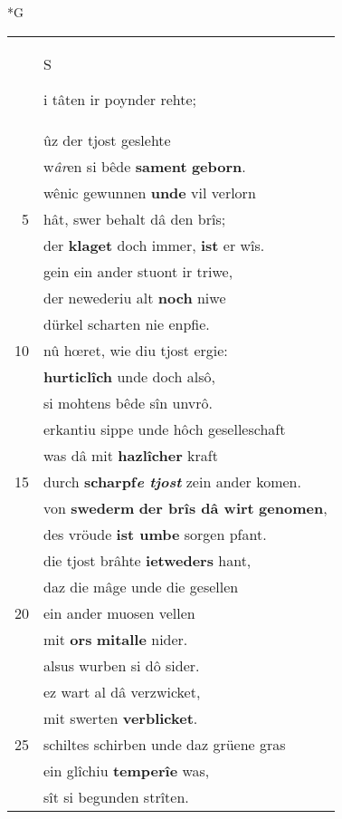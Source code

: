 \documentclass[8pt,a4paper,notitlepage]{article}
\begin{document}
\newpage
\begin{table}[ht]
\begin{minipage}[t]{0.5\linewidth}
\small
\begin{center}*G
\end{center}
\begin{tabular}{rl}
 & \begin{large}S\end{large}i tâten ir poynder rehte;\\ 
 & ûz der tjost geslehte\\ 
 & w\textit{âr}en si bêde \textbf{sament} \textbf{geborn}.\\ 
 & wênic gewunnen \textbf{unde} vil verlorn\\ 
5 & hât, swer behalt dâ den brîs;\\ 
 & der \textbf{klaget} doch immer, \textbf{ist} er wîs.\\ 
 & gein ein ander stuont ir triwe,\\ 
 & der newederiu alt \textbf{noch} niwe\\ 
 & dürkel scharten nie enpfie.\\ 
10 & nû hœret, wie diu tjost ergie:\\ 
 & \textbf{hurticlîch} unde doch alsô,\\ 
 & si mohtens bêde sîn unvrô.\\ 
 & erkantiu sippe unde hôch geselleschaft\\ 
 & was dâ mit \textbf{hazlîcher} kraft\\ 
15 & durch \textbf{scharpf\textit{e} \textit{tjost}} zein ander komen.\\ 
 & von \textbf{swederm} \textbf{der brîs dâ wirt} \textbf{genomen},\\ 
 & des vröude \textbf{ist umbe} sorgen pfant.\\ 
 & die tjost brâhte \textbf{ietweders} hant,\\ 
 & daz die mâge unde die gesellen\\ 
20 & ein ander muosen vellen\\ 
 & mit \textbf{ors} \textbf{mitalle} nider.\\ 
 & alsus wurben si dô sider.\\ 
 & ez wart al dâ verzwicket,\\ 
 & mit swerten \textbf{verblicket}.\\ 
25 & schiltes schirben unde daz grüene gras\\ 
 & ein glîchiu \textbf{temperîe} was,\\ 
 & sît si begunden strîten.\\ 

\end{tabular}
\end{minipage}
\end{table}
\end{document}
